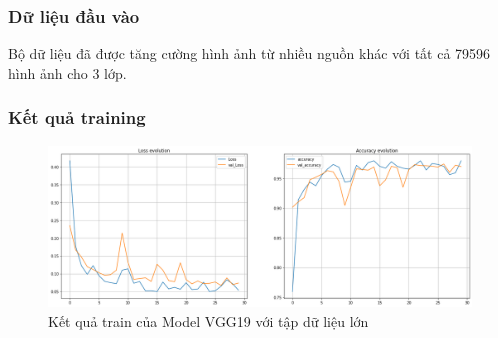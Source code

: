 \subsubsection{Dữ liệu đầu vào }
Bộ dữ liệu đã được tăng cường hình ảnh từ nhiều nguồn khác với tất cả 79596 hình ảnh cho 3 lớp.

\subsubsection{Kết quả training}
\begin{center}
    \begin{figure}[!h]
        \centering
        \includegraphics[scale = 0.38]{fileanh/vgg19_increase.png}
        \caption{Kết quả train của Model VGG19 với tập dữ liệu lớn}
    \end{figure}
\end{center}
